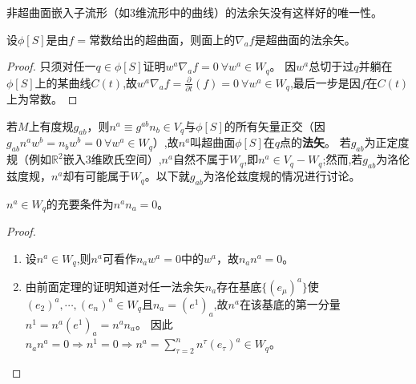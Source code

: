 \begin{note}
	非超曲面嵌入子流形（如$3$维流形中的曲线）的法余矢没有这样好的唯一性。
\end{note}

\begin{theorem}
	设$\phi[S]$是由$f = \text{常数}$给出的超曲面，则面上的$\nabla_af$是超曲面的法余矢。
\end{theorem}

\begin{proof}
	只须对任一$q \in \phi[S]$证明$w^a\nabla_af = 0 ~ \forall w^a \in W_q$。
	因$w^a$总切于过$q$并躺在$\phi[S]$上的某曲线$C(t)$,故$w^a\nabla_af = \frac{\partial}{\partial t}(f) = 0 ~ \forall w^a \in W_q$,最后一步是因$f$在$C(t)$上为常数。
\end{proof}

若$M$上有度规$g_{ab}$，则$n^a \equiv g^{ab}n_b \in V_q$与$\phi[S]$的所有矢量正交（因$g_{ab}n^aw^b = n_bw^b = 0 ~ \forall w^a \in W_q$）,故$n^a$叫超曲面$\phi[S]$在$q$点的\textbf{法矢}。
若$g_{ab}$为正定度规（例如$\mathbb{R}^2$嵌入$3$维欧氏空间）,$n^a$自然不属于$W_q$,即$n^a \in V_q - W_q$;然而,若$g_{ab}$为洛伦兹度规，$n^a$却有可能属于$W_q$。以下就$g_{ab}$为洛伦兹度规的情况进行讨论。

\begin{theorem}
	$n^a \in W_q$的充要条件为$n^an_a = 0$。
\end{theorem}

\begin{proof}
	\begin{enumerate}[（A）]
		\item 设$n^a \in W_q$,则$n^a$可看作$n_aw^a = 0$中的$w^a$，故$n_an^a = 0$。
		\item 由前面定理的证明知道对任一法余矢$n_a$存在基底$\{(e_\mu)^a\}$使$(e_2)^a, \cdots, (e_n)^a \in W_q$且$n_a = (e^1)_a$,故$n^a$在该基底的第一分量$n^1 = n^a(e^1)_a = n^an_a$。
		      因此$n_an^a = 0 \Rightarrow n^1 = 0 \Rightarrow n^a = \sum^n_{\tau = 2}n^\tau(e_\tau)^a \in W_q$。
	\end{enumerate}
\end{proof}

